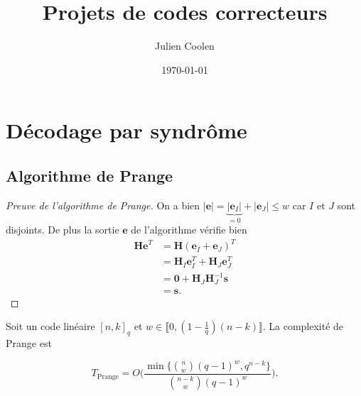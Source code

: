 \documentclass{scrartcl}[a4paper,10pt,headings=small,footinclude=false]
\title{Projets de codes correcteurs}
\author{\normalsize Julien Coolen}
\date{\normalsize\today}
\theoremstyle{definition}
\theoremstyle{remark}
\begin{document}
\maketitle
\tableofcontents

\section{Décodage par syndrôme}
\subsection{Algorithme de Prange}

\begin{algorithm}[H]
    \renewcommand{\algorithmcfname}{Algorithme}%
    \SetAlgoLined
\caption{Algorithme de Prange (1962) (type Las Vegas)}
\end{algorithm}
\begin{proof}[Preuve de l'algorithme de Prange]
On a bien $|\textbf{e}|=\underbrace{|\textbf{e}_I|}_{= 0}+|\textbf{e}_J|\leq w$ car $I$ et $J$ sont disjoints.
De plus la sortie $\textbf{e}$ de l'algorithme vérifie bien
\begin{align*}
    \textbf{He}^T &= \textbf{H}(\textbf{e}_I+\textbf{e}_J)^T\\
    &= \textbf{H}_I \textbf{e}_I^T + \textbf{H}_J \textbf{e}_J^T\\
    &= \textbf{0} + \textbf{H}_J \textbf{H}_J^{-1} \textbf{s}\\
    &= \textbf{s}.
\end{align*}
\end{proof}


Soit un code linéaire $[n,k]_q$ et $w\in\llbracket 0, (1-\frac{1}{q})(n-k)\rrbracket$.
La complexité de Prange est

\[ T_{\text{Prange}} = O\Bigg(\frac{\min \big\{ \binom{n}{w}(q-1)^w, q^{n-k} \big\}}{\binom{n-k}{w}(q-1)^w}\Bigg). \]
\end{document}

